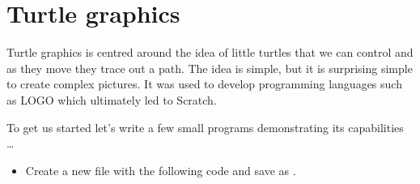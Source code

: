 \documentclass{coderdojo}
\begin{document}
\section{Turtle graphics}

Turtle graphics is centred around the idea of little turtles that we can control and as they move they trace out a path. The idea is simple, but it is surprising simple to create complex pictures. It was used to develop programming languages such as LOGO which ultimately led to Scratch.

To get us started let's write a few small programs demonstrating its capabilities \ldots

\begin{itemize}
\item[\todoSymbol] \color{todo}
Create a new file with the following code and save as .
\end{itemize}

\end{document}
